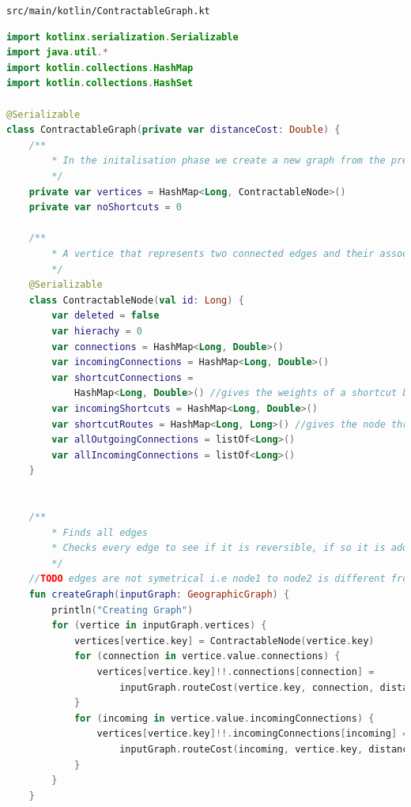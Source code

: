 \documentclass[11pt,twoside,a4paper]{report}
\begin{document}
\texttt{src/main/kotlin/ContractableGraph.kt}
\begin{lstlisting}[language=kotlin]
import kotlinx.serialization.Serializable
import java.util.*
import kotlin.collections.HashMap
import kotlin.collections.HashSet

@Serializable
class ContractableGraph(private var distanceCost: Double) {
    /**
        * In the initalisation phase we create a new graph from the previous graph
        */
    private var vertices = HashMap<Long, ContractableNode>()
    private var noShortcuts = 0

    /**
        * A vertice that represents two connected edges and their associated connections (given as id's)
        */
    @Serializable
    class ContractableNode(val id: Long) {
        var deleted = false
        var hierachy = 0
        var connections = HashMap<Long, Double>()
        var incomingConnections = HashMap<Long, Double>()
        var shortcutConnections =
            HashMap<Long, Double>() //gives the weights of a shortcut based connection to another node
        var incomingShortcuts = HashMap<Long, Double>()
        var shortcutRoutes = HashMap<Long, Long>() //gives the node through which the shortcut travels
        var allOutgoingConnections = listOf<Long>()
        var allIncomingConnections = listOf<Long>()
    }


    /**
        * Finds all edges
        * Checks every edge to see if it is reversible, if so it is added twice
        */
    //TODO edges are not symetrical i.e node1 to node2 is different from node2 to node1 so use the edgelookup system to fix this
    fun createGraph(inputGraph: GeographicGraph) {
        println("Creating Graph")
        for (vertice in inputGraph.vertices) {
            vertices[vertice.key] = ContractableNode(vertice.key)
            for (connection in vertice.value.connections) {
                vertices[vertice.key]!!.connections[connection] =
                    inputGraph.routeCost(vertice.key, connection, distanceCost, 0.0)
            }
            for (incoming in vertice.value.incomingConnections) {
                vertices[vertice.key]!!.incomingConnections[incoming] =
                    inputGraph.routeCost(incoming, vertice.key, distanceCost, 0.0)
            }
        }
    }


\end{lstlisting}
\end{document}
